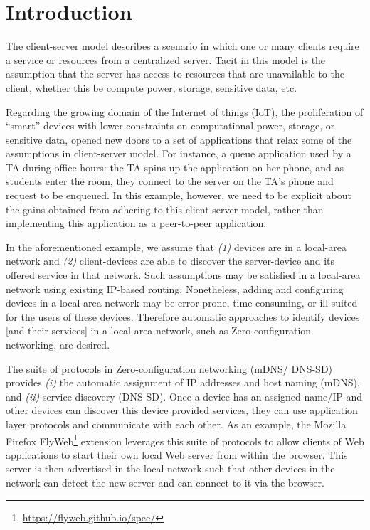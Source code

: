 \section{Introduction}
\label{sec:introduction}


The client-server model describes a scenario in which one or many clients require a service or resources from a centralized server. Tacit in this model is the assumption that the server has access to resources that are unavailable to the client, whether this be compute power, storage, sensitive data, etc. 


Regarding the growing domain of the Internet of things (IoT), the proliferation of ``smart'' devices with lower constraints on computational power, storage, or sensitive data, opened new doors to a set of applications that relax some of the assumptions in client-server model. For instance, a queue application used by a TA during office hours: the TA spins up the application on her phone, and as students enter the room, they connect to the server on the TA's phone and request to be enqueued. In this example, however, we need to be explicit about the gains obtained from adhering to this client-server model, rather than implementing this application as a peer-to-peer application.


In the aforementioned example, we assume that {\it (1)} devices are in a local-area network and {\it (2)} client-devices are able to discover the server-device and its offered service in that network. Such assumptions may be satisfied in a local-area network using existing IP-based routing. Nonetheless, adding and configuring devices in a local-area network may be error prone, time consuming, or ill suited for the users of these devices. Therefore automatic approaches to identify devices [and their services] in a local-area network, such as Zero-configuration networking, are desired. 


The suite of protocols in Zero-configuration networking (mDNS/ DNS-SD)~\cite{rfc6762,rfc6763} provides {\it (i)} the automatic assignment of IP addresses and host naming (mDNS), and {\it (ii)} service discovery (DNS-SD). Once a device has an assigned name/IP and other devices can discover this device provided services, they can use application layer protocols and communicate with each other. As an example, the Mozilla Firefox FlyWeb\footnote{\url{https://flyweb.github.io/spec/}} extension leverages this suite of protocols to allow clients of Web applications to start their own local Web server from within the browser. This server is then advertised in the local network such that other devices in the network can detect the new server and can connect to it via the browser. 


